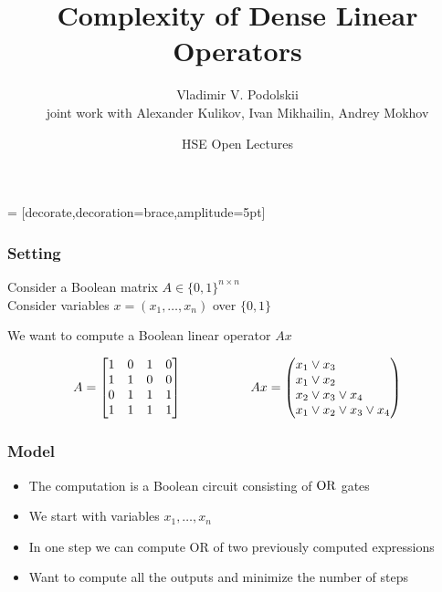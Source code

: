 \documentclass{beamer}
\author{Vladimir V. Podolskii\inst{1}\\[3mm] \small joint work with Alexander Kulikov, Ivan Mikhailin, Andrey Mokhov}
\institute{
 \inst{1} \  Steklov\ Mathematical\ Institute, Moscow\\
 Higher School of Economics, Moscow\\
}
\date{HSE Open Lectures}
\title{Complexity of Dense Linear Operators}
\begin{document}
 = [decorate,decoration={brace,amplitude=5pt}]


\begin{frame}

\titlepage

\end{frame}



\begin{frame}
\frametitle{Setting}

Consider a Boolean matrix $A \in \{0,1\}^{n\times n}$\\
Consider variables $x = (x_1,\ldots, x_n)$ over $\{0,1\}$

\medskip
We want to compute a Boolean linear operator $A x$

\medskip

\[
  A =\begin{bmatrix}
    1 & 0 & 1 & 0 \\
    1 & 1 & 0 & 0 \\
    0 & 1 & 1 & 1 \\
    1 & 1 & 1 & 1 \\
  \end{bmatrix}
 \ \ \ \ \ \ \ \ \ \ \ \ \ \ \ \ Ax = \left(\begin{array}{@{}l@{}}
    x_1 \vee x_3 \\
    x_1 \vee x_2 \\
    x_2 \vee x_3 \vee x_4 \\
    x_1 \vee x_2 \vee x_3 \vee x_4\\
  \end{array}\right)
  \]



\end{frame}



\begin{frame}
\frametitle{Model}

\begin{itemize}
\item The computation is a Boolean circuit consisting of ${\rm OR}$ gates
\item We start with variables $x_1,\ldots, x_n$
\item In one step we can compute OR of two previously computed expressions
\item Want to compute all the outputs and minimize the number of steps
\end{itemize}

\end{frame}
\end{document}

